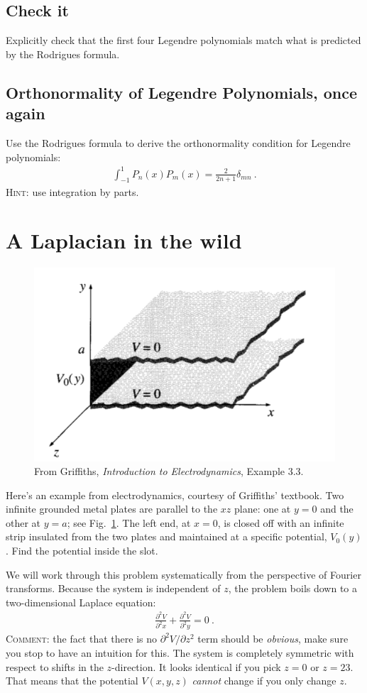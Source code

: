 \documentclass[12pt]{article}
\numberwithin{equation}{section}    %
\begin{document}
\subsection{Check it}
Explicitly check that the first four Legendre polynomials match what is predicted by the Rodrigues formula.

\subsection{Orthonormality of Legendre Polynomials, once again}
 
 Use the Rodrigues formula to derive the orthonormality condition for Legendre polynomials:
 \begin{align}
 	\int_{-1}^1 P_n(x)P_m(x) = \frac{2}{2n+1} \delta_{mn} \  .
 \end{align}
 \textsc{Hint:} use integration by parts. 
 

\section{A Laplacian in the wild}

\begin{figure}[h]
\centering
\includegraphics[width=.3\textwidth]{figures/GriffithsEM3-17.png}
\caption{From Griffiths, \emph{Introduction to Electrodynamics}, Example 3.3. }
\label{fig:grif}
\end{figure}

Here's an example from electrodynamics, courtesy of Griffiths' textbook. Two infinite grounded metal plates are parallel to the $xz$ plane: one at $y=0$ and the other at $y=a$; see Fig.~\ref{fig:grif}. The left end, at $x=0$, is closed off with an infinite strip insulated from the two plates and maintained at a specific potential, $V_0(y)$. Find the potential inside the slot.

We will work through this problem systematically from the perspective of Fourier transforms.  Because the system is independent of $z$, the problem boils down to a two-dimensional Laplace equation:
\begin{align}
	\frac{\partial^2V}{\partial^2x}+
	\frac{\partial^2V}{\partial^2y}
	= 0 \ .
\end{align}
\textsc{Comment:} the fact that there is no $\partial^2 V/\partial z^2$ term should be \emph{obvious}, make sure you stop to have an intuition for this. The system is completely symmetric with respect to shifts in the $z$-direction. It looks identical if you pick $z=0$ or $z=23$. That means that the potential $V(x,y,z)$ \emph{cannot} change if you only change $z$.
\end{document}

